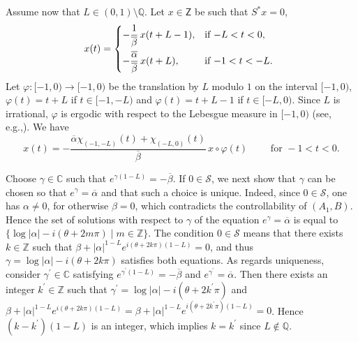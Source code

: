\documentclass[JEP,XML,SOM,Unicode]{cedram}
\renewcommand{\eg}{e.g.,\xspace}
\theoremstyle{plain}
\theoremstyle{definition}
\newcommand{\abs}[1]{\left\lvert #1\right \rvert}
\begin{document}
Assume now that $L \in (0, 1) \setminus \mathbb Q$. Let $x \in \mathsf Z$ be such that $S^\ast x = 0$, \ie 
\[
x(t) =
\begin{dcases*}
-\frac{1}{\overline\beta}\, x(t + L - 1), & if $-L < t < 0$, \\
-\frac{\overline\alpha}{\overline\beta}\, x(t + L), & if $-1 < t < -L$.
\end{dcases*}
\]
Let $\varphi: [-1, 0) \to [-1, 0)$ be the translation by $L$ modulo $1$ on the interval $[-1, 0)$, \ie $\varphi(t) = t + L$ if $t \in [-1, -L)$ and $\varphi(t) = t + L - 1$ if $t \in [-L, 0)$. Since $L$ is irrational, $\varphi$ is ergodic with respect to the Lebesgue measure in $[-1, 0)$ (see, \eg \cite[Chap.\,II, Th.\,3.2]{Mane1987Ergodic}). We have
\[
x(t) = -\frac{\overline\alpha \chi_{(-1, -L)}(t) + \chi_{(-L, 0)}(t)}{\overline\beta}\, x \circ \varphi(t) \qquad \text{ for } -1 < t < 0.
\]

Choose $\gamma \in \mathbb C$ such that $e^{\gamma (1 - L)} = -\overline\beta$. If $0 \in \mathcal S$, we next show that $\gamma$ can be chosen so that $e^{\gamma} = \overline\alpha$ and that such a choice is unique. Indeed, since $0 \in \mathcal S$, one has $\alpha \neq 0$, for otherwise $\beta = 0$, which contradicts the controllability of $(A_1, B)$. Hence the set of solutions with respect to $\gamma$ of the equation $e^{\gamma} = \overline\alpha$ is equal to $\{\log \abs{\alpha} - i (\theta + 2 m \pi) \mid m \in \mathbb Z\}$. The condition $0 \in \mathcal S$ means that there exists $k \in \mathbb Z$ such that $\beta + \abs{\alpha}^{1 - L} e^{i (\theta + 2 k \pi)(1 - L)} = 0$, and thus $\gamma = \log \abs{\alpha} - i (\theta + 2 k \pi)$ satisfies both equations. As regards uniqueness, consider $\gamma^\prime \in \mathbb C$ satisfying $e^{\gamma^\prime (1 - L)} = -\overline\beta$ and $e^{\gamma^\prime} = \overline\alpha$. Then there exists an integer $k^\prime \in \mathbb Z$ such that $\gamma^\prime = \log \abs{\alpha} - i (\theta + 2 k^\prime \pi)$ and $\beta + \abs{\alpha}^{1 - L} e^{i (\theta + 2 k \pi)(1 - L)} = \beta + \abs{\alpha}^{1 - L} e^{i (\theta + 2 k^\prime \pi)(1 - L)} = 0$. Hence $(k - k^\prime)(1 - L)$ is an integer, which implies $k = k^\prime$ since $L \notin \mathbb Q$.
\end{document}
